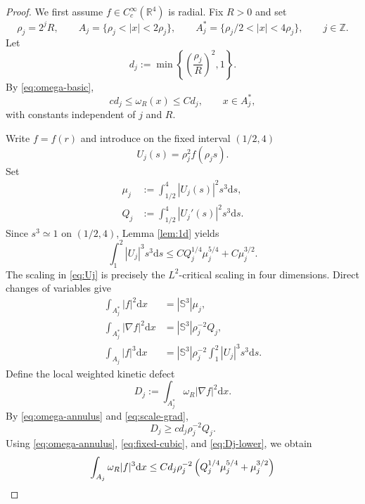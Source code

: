 \documentclass[12pt]{amsart}
\numberwithin{equation}{section}
\theoremstyle{remark}
\newcommand{\R}{\mathbb{R}}
\newcommand{\dd}{\mathrm{d}x}
\newcommand{\dds}{\mathrm{d}s}
\begin{document}
\begin{proof}
We first assume $f\in C_c^\infty(\R^4)$ is radial.  Fix $R>0$ and set
\[
 \rho_j=2^jR, \qquad A_j=\{\rho_j<|x|<2\rho_j\},
 \qquad A_j^*=\{\rho_j/2<|x|<4\rho_j\}, \qquad j\in\mathbb Z.
\]
Let
\begin{equation*}
 d_j:=\min\left\{\left(\frac{\rho_j}{R}\right)^2,1\right\}.
\end{equation*}
By \eqref{eq:omega-basic},
\begin{equation}\label{eq:omega-annulus}
 c d_j\le \omega_R(x)\le C d_j,
 \qquad x\in A_j^*,
\end{equation}
with constants independent of $j$ and $R$.

Write $f=f(r)$ and introduce on the fixed interval $(1/2,4)$
\begin{equation}\label{eq:Uj}
 U_j(s)=\rho_j^2f(\rho_js).
\end{equation}
Set
\begin{align*}
 \mu_j&:=\int_{1/2}^4|U_j(s)|^2s^3\dds,\\
 Q_j&:=\int_{1/2}^4|U_j'(s)|^2s^3\dds.
\end{align*}
Since $s^3\simeq1$ on $(1/2,4)$, Lemma \ref{lem:1d} yields
\begin{equation}\label{eq:fixed-cubic}
 \int_1^2|U_j|^3s^3\dds
 \le C Q_j^{1/4}\mu_j^{5/4}+C\mu_j^{3/2}.
\end{equation}
The scaling in \eqref{eq:Uj} is precisely the $L^2$-critical scaling in four dimensions.  Direct changes of variables give
\begin{align}
 \int_{A_j^*}|f|^2\dd&=|\mathbb S^3|\mu_j,\nonumber\\
 \int_{A_j^*}|\nabla f|^2\dd&=|\mathbb S^3|\rho_j^{-2}Q_j,\label{eq:scale-grad}\\
 \int_{A_j}|f|^3\dd&=|\mathbb S^3|\rho_j^{-2}\int_1^2|U_j|^3s^3\dds.\nonumber
\end{align}
Define the local weighted kinetic defect
\begin{equation*}
 D_j:=\int_{A_j^*}\omega_R|\nabla f|^2\dd.
\end{equation*}
By \eqref{eq:omega-annulus} and \eqref{eq:scale-grad},
\begin{equation}\label{eq:Dj-lower}
 D_j\ge cd_j\rho_j^{-2}Q_j.
\end{equation}
Using \eqref{eq:omega-annulus}, \eqref{eq:fixed-cubic}, and \eqref{eq:Dj-lower}, we obtain
\begin{align}
 \int_{A_j}\omega_R|f|^3\dd
 &\le C d_j\rho_j^{-2} \left(Q_j^{1/4}\mu_j^{5/4}+\mu_j^{3/2}\right)\notag\\

\end{align}
\end{proof}
\end{document}
